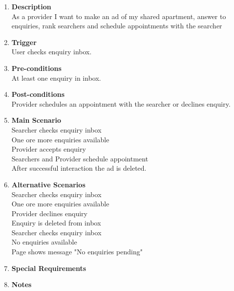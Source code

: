 \documentclass{scrreprt}
\begin{document}
\begin{enumerate}
\begin{enumerate}
		\item \textbf{Description} \\
			As a provider I want to make an ad of my shared apartment, answer to enquiries, rank searchers and schedule appointments with the searcher\\

		\item \textbf{Trigger} \\
			User checks enquiry inbox.\\

		\item \textbf{Pre-conditions} \\
			At least one enquiry in inbox.\\

		\item \textbf{Post-conditions} \\
			Provider schedules an appointment with the searcher or declines enquiry.\\

		\item \textbf{Main Scenario} \\
			Searcher checks enquiry inbox\\
			One ore more enquiries available\\
			Provider accepts enquiry\\
			Searchers and Provider schedule appointment\\
			After successful interaction the ad is deleted.\\

		\item \textbf{Alternative Scenarios} \\
			Searcher checks enquiry inbox\\
			One ore more enquiries available\\
			Provider declines enquiry\\
			Enquiry is deleted from inbox\\
			
			Searcher checks enquiry inbox\\
			No enquiries available\\
			Page shows message "No enquiries pending"\\

		\item \textbf{Special Requirements} \\

		\item \textbf{Notes} \\
	\end{enumerate}


\end{enumerate}
\end{document}
